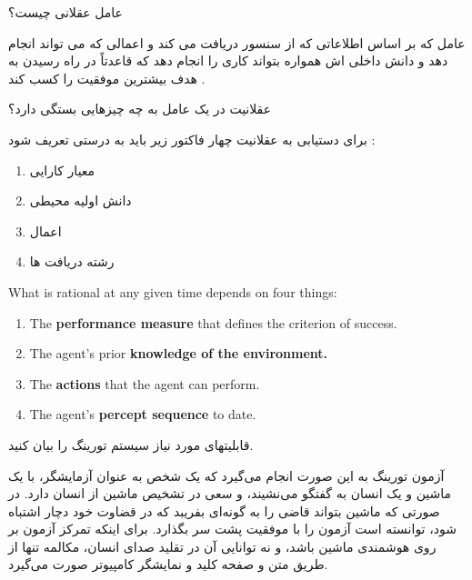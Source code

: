 \documentclass[12pt]{article}
\begin{document}
\newpage
\vspace{20pt}
\noindent
عامل عقلانی چیست؟

\begin{tcolorbox}
\noindent
عامل که بر اساس اطلاعاتی که از سنسور دریافت می کند و اعمالی که می تواند انجام دهد و دانش داخلی اش همواره بتواند کاری را انجام دهد که قاعدتاً در راه رسیدن به هدف بیشترین موفقیت را کسب کند .

\end{tcolorbox}


\vspace{20pt}
\noindent
عقلانیت در یک عامل به چه چیزهایی بستگی دارد؟




\begin{tcolorbox}
\noindent
برای دستیابی به عقلانیت چهار فاکتور زیر باید به درستی تعریف شود :

\begin{enumerate}
	\item معیار کارایی
	\item دانش اولیه محیطی
	\item اعمال
	\item رشته دریافت ها
\end{enumerate}
\end{tcolorbox}


\begin{latin}
\begin{tcolorbox}
\noindent
What is rational at any given time depends on four things:

\begin{enumerate}
	\item The \textbf{performance measure} that defines the criterion of success.
	\item The agent’s prior \textbf{knowledge of the environment.}
	\item The \textbf{actions} that the agent can perform.
	\item The agent’s \textbf{percept sequence} to date.
\end{enumerate}
\end{tcolorbox}
\end{latin}




\newpage
\vspace{20pt}
\noindent
قابلیتهای مورد نیاز سیستم تورینگ را بیان کنید.



\begin{tcolorbox}
آزمون تورینگ به این صورت انجام می‌گیرد که یک شخص به عنوان آزمایشگر، با یک ماشین و یک انسان به گفتگو می‌نشیند، و سعی در تشخیص ماشین از انسان دارد. در صورتی که ماشین بتواند قاضی را به گونه‌ای بفریبد که در قضاوت خود دچار اشتباه شود، توانسته‌ است آزمون را با موفقیت پشت سر بگذارد. برای اینکه تمرکز آزمون بر روی هوشمندی ماشین باشد، و نه توانایی آن در تقلید صدای انسان، مکالمه تنها از طریق متن و صفحه کلید و نمایشگر کامپیوتر صورت می‌گیرد. 
\end{tcolorbox}
\end{document}
